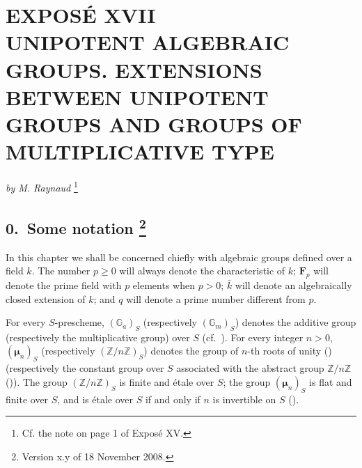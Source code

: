 

\chapter*{EXPOSÉ XVII\\[0.4em]
UNIPOTENT ALGEBRAIC GROUPS. EXTENSIONS BETWEEN UNIPOTENT GROUPS AND GROUPS OF MULTIPLICATIVE TYPE}

\begin{center}
\textit{by M. Raynaud}%
\begingroup
\renewcommand{\thefootnote}{*}%
\footnote{Cf. the note on page 1 of Exposé XV.}%
\endgroup
\end{center}

\section*{0.\ Some notation%
\begingroup
\renewcommand{\thefootnote}{0}%
\footnote{Version x.y of 18 November 2008.}%
\endgroup}

In this chapter we shall be concerned chiefly with algebraic groups defined over a
field \(k\).  The number \(p\geq 0\) will always denote the characteristic of \(k\);
\(\mathbf F_p\) will denote the prime field with \(p\) elements when \(p>0\);
\(\bar{k}\) will denote an algebraically closed extension of \(k\); and \(q\) will
denote a prime number different from \(p\).

For every \(S\)-prescheme, \((\mathbb G_a)_S\) (respectively
\((\mathbb G_m)_S\)) denotes the additive group (respectively the multiplicative
group) over \(S\) (cf.\ ).  For every integer \(n>0\),
\((\boldsymbol\mu_n)_S\) (respectively \((\mathbb Z/n\mathbb Z)_S\)) denotes the
group of \(n\)-th roots of unity () (respectively the constant group
over \(S\) associated with the abstract group \(\mathbb Z/n\mathbb Z\)
()).  The group \((\mathbb Z/n\mathbb Z)_S\) is finite and étale
over \(S\); the group \((\boldsymbol\mu_n)_S\) is flat and finite over \(S\), and
is étale over \(S\) if and only if \(n\) is invertible on \(S\)
().


